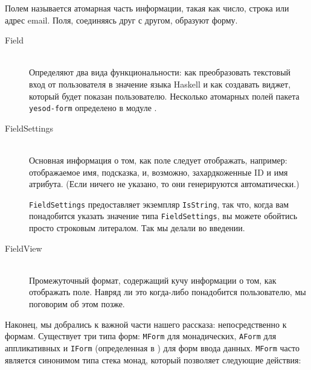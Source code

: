 \begin{remark}
Полем называется атомарная часть информации, такая как число, строка или адрес
email. Поля, соединяясь друг с другом, образуют форму.
\end{remark}

\begin{description}
\item[Field] \hfill \\
Определяют два вида функциональности: как преобразовать текстовый вход от пользователя 
в значение языка Haskell и как создавать виджет, который будет показан пользователю.
Несколько атомарных полей пакета \lstinline'yesod-form' определено в модуле
 .

\item[FieldSettings] \hfill \\
Основная информация о том, как поле следует отображать, например: отображаемое имя,
подсказка, и, возможно, захардкоженные ID и имя атрибута. (Если ничего не указано, то они
генерируются автоматически.)

\begin{remark}
\lstinline'FieldSettings' предоставляет экземпляр \lstinline'IsString', так что, 
когда вам понадобится указать значение типа \lstinline'FieldSettings', вы можете 
обойтись просто строковым литералом. Так мы делали во введении.
\end{remark}

\item[FieldView] \hfill \\
Промежуточный формат, содержащий кучу информации о том, как отображать поле. 
Навряд ли это когда-либо понадобится пользователю, мы поговорим об этом позже.
\end{description}


Наконец, мы добрались к важной части нашего рассказа: непосредственно к формам. Существует
три типа форм: \lstinline'MForm' для монадических, \lstinline'AForm' для аппликативных и
\lstinline'IForm' (определенная в 
) 
для форм ввода данных. \lstinline'MForm' часто является синонимом типа стека 
монад, который позволяет следующие действия:

